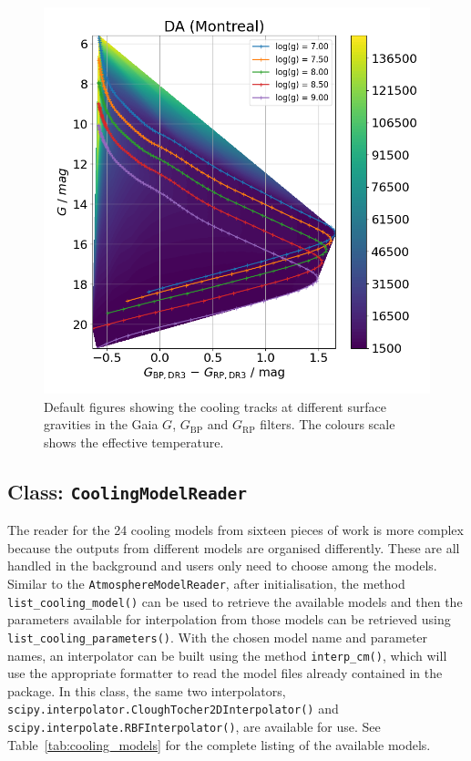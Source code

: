\documentclass[fleqn,usenatbib]{rasti}
\begin{document}
\begin{figure}
    \centering
    \includegraphics[width=\columnwidth]{fig_01_DA_cooling_tracks_from_plotter.png}
    \caption{Default figures showing the cooling tracks at different surface
    gravities in the Gaia $G$, $G_{\mathrm{BP}}$ and $G_{\mathrm{RP}}$ filters.
    The colours scale shows the effective temperature.}
    \label{fig:cooling_tracks_default}
\end{figure}

\subsection{Class: \texttt{CoolingModelReader}}
The reader for the 24 cooling models from sixteen pieces of work
is more complex because the outputs from different models are
organised differently. These are all handled in the background and users only
need to choose among the models. Similar to the \texttt{AtmosphereModelReader},
after initialisation, the method \texttt{list\_cooling\_model()} can be used to
retrieve the available models and then the parameters available for
interpolation from those models can be retrieved using
\texttt{list\_cooling\_parameters()}. With the chosen model name and parameter
names, an interpolator can be built using the method \texttt{interp\_cm()}, which
will use the appropriate formatter to read the model files already contained in
the package. In this class, the same two interpolators,
\texttt{scipy.interpolator.CloughTocher2DInterpolator()} and
\texttt{scipy.interpolate.RBFInterpolator()}, are available for use. See
Table~\ref{tab:cooling_models} for the complete listing of the
available models.
\end{document}
